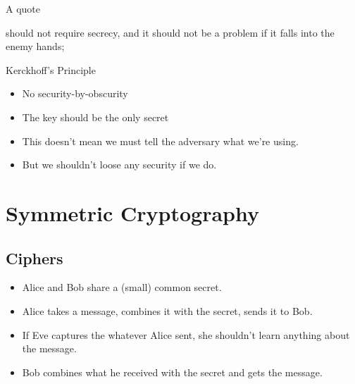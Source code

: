 \begin{frame}
  \begin{block}{A quote}
    \begin{displayquote}\relax
      [A cryptosystem] should not require secrecy, and it should not be 
      a problem
      if it falls into the enemy hands;
    \end{displayquote}
  \end{block}

  \pause{}

  \begin{block}{Kerckhoff's Principle}
    \begin{itemize}
      \item No security-by-obscurity
      \item The key should be the only secret
    \end{itemize}
  \end{block}
\end{frame}

\begin{frame}
  \begin{remark}
    \begin{itemize}
      \item This doesn't mean we must tell the adversary what we're using.
      \item But we shouldn't loose any security if we do.
    \end{itemize}
  \end{remark}
\end{frame}


\section{Symmetric Cryptography}

\subsection{Ciphers}

\begin{frame}
  \begin{idea}
    \begin{itemize}
      \item Alice and Bob share a (small) common secret.

        \pause{}

      \item Alice takes a message, combines it with the secret, sends it to 
        Bob.

        \pause{}

      \item If Eve captures the whatever Alice sent, she shouldn't learn 
        anything about the message.

        \pause{}

      \item Bob combines what he received with the secret and gets the message.
    \end{itemize}
  \end{idea}
\end{frame}

